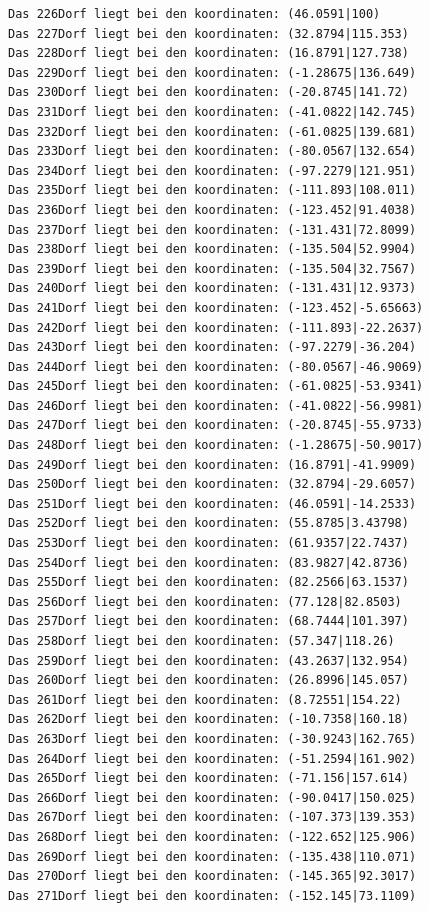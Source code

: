 \documentclass{article}
\begin{document}
\begin{verbatim}
Das 226Dorf liegt bei den koordinaten: (46.0591|100)
Das 227Dorf liegt bei den koordinaten: (32.8794|115.353)
Das 228Dorf liegt bei den koordinaten: (16.8791|127.738)
Das 229Dorf liegt bei den koordinaten: (-1.28675|136.649)
Das 230Dorf liegt bei den koordinaten: (-20.8745|141.72)
Das 231Dorf liegt bei den koordinaten: (-41.0822|142.745)
Das 232Dorf liegt bei den koordinaten: (-61.0825|139.681)
Das 233Dorf liegt bei den koordinaten: (-80.0567|132.654)
Das 234Dorf liegt bei den koordinaten: (-97.2279|121.951)
Das 235Dorf liegt bei den koordinaten: (-111.893|108.011)
Das 236Dorf liegt bei den koordinaten: (-123.452|91.4038)
Das 237Dorf liegt bei den koordinaten: (-131.431|72.8099)
Das 238Dorf liegt bei den koordinaten: (-135.504|52.9904)
Das 239Dorf liegt bei den koordinaten: (-135.504|32.7567)
Das 240Dorf liegt bei den koordinaten: (-131.431|12.9373)
Das 241Dorf liegt bei den koordinaten: (-123.452|-5.65663)
Das 242Dorf liegt bei den koordinaten: (-111.893|-22.2637)
Das 243Dorf liegt bei den koordinaten: (-97.2279|-36.204)
Das 244Dorf liegt bei den koordinaten: (-80.0567|-46.9069)
Das 245Dorf liegt bei den koordinaten: (-61.0825|-53.9341)
Das 246Dorf liegt bei den koordinaten: (-41.0822|-56.9981)
Das 247Dorf liegt bei den koordinaten: (-20.8745|-55.9733)
Das 248Dorf liegt bei den koordinaten: (-1.28675|-50.9017)
Das 249Dorf liegt bei den koordinaten: (16.8791|-41.9909)
Das 250Dorf liegt bei den koordinaten: (32.8794|-29.6057)
Das 251Dorf liegt bei den koordinaten: (46.0591|-14.2533)
Das 252Dorf liegt bei den koordinaten: (55.8785|3.43798)
Das 253Dorf liegt bei den koordinaten: (61.9357|22.7437)
Das 254Dorf liegt bei den koordinaten: (83.9827|42.8736)
Das 255Dorf liegt bei den koordinaten: (82.2566|63.1537)
Das 256Dorf liegt bei den koordinaten: (77.128|82.8503)
Das 257Dorf liegt bei den koordinaten: (68.7444|101.397)
Das 258Dorf liegt bei den koordinaten: (57.347|118.26)
Das 259Dorf liegt bei den koordinaten: (43.2637|132.954)
Das 260Dorf liegt bei den koordinaten: (26.8996|145.057)
Das 261Dorf liegt bei den koordinaten: (8.72551|154.22)
Das 262Dorf liegt bei den koordinaten: (-10.7358|160.18)
Das 263Dorf liegt bei den koordinaten: (-30.9243|162.765)
Das 264Dorf liegt bei den koordinaten: (-51.2594|161.902)
Das 265Dorf liegt bei den koordinaten: (-71.156|157.614)
Das 266Dorf liegt bei den koordinaten: (-90.0417|150.025)
Das 267Dorf liegt bei den koordinaten: (-107.373|139.353)
Das 268Dorf liegt bei den koordinaten: (-122.652|125.906)
Das 269Dorf liegt bei den koordinaten: (-135.438|110.071)
Das 270Dorf liegt bei den koordinaten: (-145.365|92.3017)
Das 271Dorf liegt bei den koordinaten: (-152.145|73.1109)

\end{verbatim}
\end{document}
